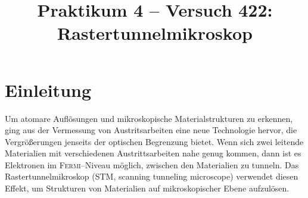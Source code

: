 \documentclass[sn-mathphys-num,iicol]{sn-jnl}
\theoremstyle{thmstyleone}
\theoremstyle{thmstyletwo}
\theoremstyle{thmstylethree}
\begin{document}
        
\title[]{Praktikum 4 -- Versuch 422: Rastertunnelmikroskop}
\author*[1]{ }
\author*[2]{ }

\maketitle

\section{Einleitung}
Um atomare Auflösungen und mikroskopische Materialstrukturen zu erkennen, ging aus der Vermessung von Austritsarbeiten eine neue Technologie hervor, die Vergrößerungen jenseits der optischen Begrenzung bietet.
Wenn sich zwei leitende Materialien mit verschiedenen Austrittsarbeiten nahe genug kommen, dann ist es Elektronen im \textsc{Fermi}--Niveau möglich, zwischen den Materialien zu tunneln.
Das Rastertunnelmikroskop (STM, scanning tunneling microscope) verwendet diesen Effekt, um Strukturen von Materialien auf mikroskopischer Ebene aufzulösen.
\end{document}

